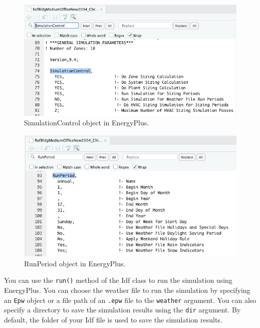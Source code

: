 \documentclass[
]{book}
\newenvironment{Shaded}{\begin{snugshade}}{\end{snugshade}}
\newcommand{\AttributeTok}[1]{\textcolor[rgb]{0.77,0.63,0.00}{#1}}
\newcommand{\FunctionTok}[1]{\textcolor[rgb]{0.00,0.00,0.00}{#1}}
\newcommand{\NormalTok}[1]{#1}
\newcommand{\OtherTok}[1]{\textcolor[rgb]{0.56,0.35,0.01}{#1}}
\newcommand{\SpecialCharTok}[1]{\textcolor[rgb]{0.00,0.00,0.00}{#1}}
\newcommand{\StringTok}[1]{\textcolor[rgb]{0.31,0.60,0.02}{#1}}
\begin{document}
\begin{figure}

{\centering \includegraphics[width=0.8\linewidth]{figures/sim_control} 

}

\caption{SimulationControl object in EnergyPlus.}\label{fig:sim-control}
\end{figure}

\begin{figure}

{\centering \includegraphics[width=0.8\linewidth]{figures/run_period} 

}

\caption{RunPeriod object in EnergyPlus.}\label{fig:run-period}
\end{figure}

You can use the \texttt{run()} method of the Idf class to run the simulation using EnergyPlus. You can choose the weather file to run the simulation by specifying an \texttt{Epw} object or a file path of an \texttt{.epw} file to the \texttt{weather} argument. You can also specify a directory to save the simulation results using the \texttt{dir} argument. By default, the folder of your Idf file is used to save the simulation results.

\begin{Shaded}
\end{Shaded}
\end{document}
